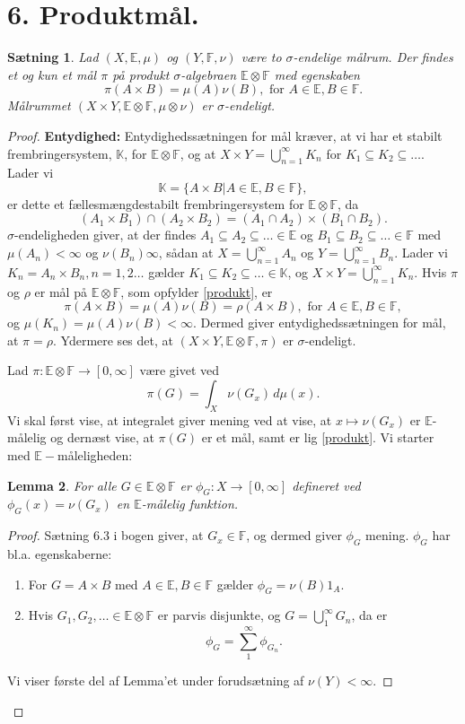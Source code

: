 \documentclass[12pt]{report}
\newtheorem{lemma}{Lemma}
\newtheorem{theorem}[lemma]{Sætning}
\theoremstyle{break}
\newtheorem*{proof}{Bevis}
\theoremstyle{break}
\newcommand{\EE}{\mathbb{E}}
\newcommand{\FF}{\mathbb{F}}
\newcommand{\K}{\mathbb{K}}
\newcommand{\1}{\mathds{1}}
\begin{document}
\newpage
\section*{6. Produktmål.}
\begin{theorem}
Lad $(X,\EE,\mu)$ og $(Y,\FF,\nu)$ være to $\sigma$-endelige målrum. Der findes et og kun et mål $\pi$ på produkt $\sigma$-algebraen $\EE\otimes\FF$ med egenskaben
\begin{equation}\label{produkt}
\pi(A\times B)=\mu(A)\nu(B), \text{ for } A\in\EE, B\in\FF.
\end{equation}
Målrummet $(X\times Y,\EE\otimes\FF,\mu\otimes\nu)$ er $\sigma$-endeligt.
\end{theorem}
\begin{proof}
{\bf{Entydighed:}} Entydighedssætningen for mål kræver, at vi har et stabilt frembringersystem, $\K$, for $\EE\otimes\FF$, og at $X\times Y = \bigcup_{n = 1}^\infty  {K_n}$ for $K_1\subseteq K_2\subseteq\ldots$.
Lader vi
\[\K = \{A\times B\vert A\in\EE,B\in\FF\},\]
er dette et fællesmængdestabilt frembringersystem for $\EE\otimes\FF$, da
\[\left(A_1\times B_1\right)\cap\left(A_2\times B_2\right) = \left(A_1\cap A_2\right)\times\left(B_1\cap B_2\right).\]
$\sigma$-endeligheden giver, at der findes $A_1\subseteq A_2\subseteq\ldots\in\EE$ og $B_1\subseteq B_2\subseteq\ldots\in\FF$ med $\mu(A_n)<\infty$ og $\nu(B_n)\infty$, sådan at $X = \bigcup_{n = 1}^\infty  {A_n}$ og $Y=\bigcup_{n=1}^\infty {B_n}$. Lader vi $K_n=A_n\times B_n, n=1,2\ldots$ gælder $K_1\subseteq K_2\subseteq\ldots\in\K$, og $X\times Y=\bigcup_{n=1}^\infty K_n$. Hvis $\pi$ og $\rho$ er mål på $\EE\otimes\FF$, som opfylder \eqref{produkt}, er
\[\pi(A\times B)=\mu(A)\nu(B)=\rho(A\times B), \text{ for }A\in\EE,B\in\FF,\]
og $\mu(K_n)=\mu(A)\nu(B)<\infty.$ Dermed giver entydighedssætningen for mål, at $\pi=\rho$. Ydermere ses det, at $(X\times Y,\EE\otimes\FF,\pi)$ er $\sigma$-endeligt.

\bigskip 

 Lad $\pi\colon\EE\otimes\FF\to[0,\infty]$ være givet ved
\[\pi(G)=\int_X\nu(G_x)\,d\mu(x).\]
Vi skal først vise, at integralet giver mening ved at vise, at $x\mapsto\nu(G_x)$ er $\EE$-målelig og dernæst vise, at $\pi(G)$ er et mål, samt er lig \eqref{produkt}. Vi starter med $\EE-$måleligheden:
\begin{lemma}
For alle $G\in\EE\otimes\FF$ er $\phi_G\colon X\to[0,\infty]$ defineret ved $\phi_G(x)=\nu(G_x)$ en $\EE$-målelig funktion.
\end{lemma}
\begin{proof}
Sætning 6.3 i bogen giver, at $G_x\in\FF$, og dermed giver $\phi_G$ mening. $\phi_G$ har bl.a. egenskaberne:
\begin{enumerate}[label=(\alph*)]
\item For $G=A\times B$ med $A\in\EE, B\in\FF$ gælder $\phi_G = \nu(B)1_A$.
\item Hvis $G_1,G_2,\ldots\in\EE\otimes\FF$ er parvis disjunkte, og $G=\bigcup_1^\infty G_n$, da er \[\phi_G = \sum\limits_1^\infty\phi_{G_n}.\] 
\end{enumerate}
Vi viser første del af Lemma'et under forudsætning af $\nu(Y)<\infty$.


\end{proof}
\end{proof}
\end{document}
